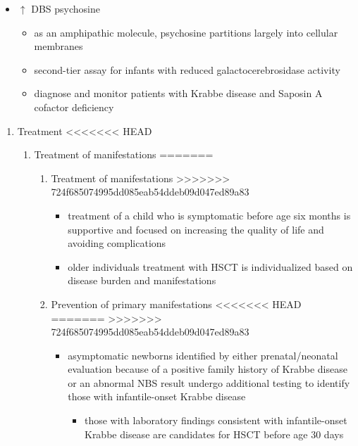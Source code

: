 \documentclass[fontsize=12pt]{scrartcl}
\begin{document}
\begin{enumerate}
\begin{enumerate}
\begin{enumerate}
\begin{enumerate}
\begin{table}[htbp]
\begin{enumerate}
\begin{enumerate}
\begin{table}[htbp]
\begin{enumerate}
\begin{itemize}
\begin{itemize}
\begin{enumerate}
\begin{enumerate}
\begin{enumerate}
\begin{itemize}
\item \(\uparrow\) DBS psychosine
\begin{itemize}
\item as an amphipathic molecule, psychosine partitions largely into
cellular membranes
\item second-tier assay for infants with reduced galactocerebrosidase activity
\item diagnose and monitor patients with Krabbe disease and Saposin A
cofactor deficiency
\end{itemize}
\end{itemize}

\begin{enumerate}
\item Treatment
<<<<<<< HEAD
\label{sec:org7e3cc32}
\begin{enumerate}
\item Treatment of manifestations
\label{sec:org710ff1e}
=======
\label{sec:orgafea445}
\begin{enumerate}
\item Treatment of manifestations
\label{sec:orgb028c58}
>>>>>>> 724f685074995dd085eab54ddeb09d047ed89a83
\begin{itemize}
\item treatment of a child who is symptomatic before age six months is
supportive and focused on increasing the quality of life and
avoiding complications
\item older individuals treatment with HSCT is individualized based on
disease burden and manifestations
\end{itemize}

\item Prevention of primary manifestations
<<<<<<< HEAD
\label{sec:org752cd82}
=======
\label{sec:org532fbc1}
>>>>>>> 724f685074995dd085eab54ddeb09d047ed89a83
\begin{itemize}
\item asymptomatic newborns identified by either prenatal/neonatal
evaluation because of a positive family history of Krabbe disease
or an abnormal NBS result undergo additional testing to identify
those with infantile-onset Krabbe disease
\begin{itemize}
\item those with laboratory findings consistent with infantile-onset
Krabbe disease are candidates for HSCT before age 30 days
\end{itemize}
\end{itemize}


\end{enumerate}
\end{enumerate}
\end{enumerate}
\end{enumerate}
\end{enumerate}
\end{enumerate}
\end{itemize}
\end{itemize}
\end{enumerate}
\end{table}
\end{enumerate}
\end{enumerate}
\end{table}
\end{enumerate}
\end{enumerate}
\end{enumerate}
\end{enumerate}
\end{document}
